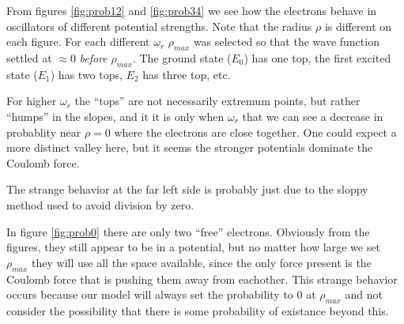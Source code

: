 

From figures \ref{fig:prob12} and \ref{fig:prob34} we see how the
electrons behave in oscillators of different potential strengths.
Note that the radius $\rho$ is different on each figure. For each
different $\omega_r$ $\rho_{max}$ was selected so that the wave
function settled at $\approx 0$ \emph{before} $\rho_{max}$. The
ground state ($E_0$) has one top, the first excited state ($E_1$)
has two tops, $E_2$ has three top, etc.

For higher $\omega_r$ the ``tops'' are not necessarily extremum
points, but rather ``humps'' in the slopes, and it it is only when
$\omega_r$ that we can see a decrease in probablity near $\rho = 0$
where the electrons are close together. One could expect a more
distinct valley here, but it seems the stronger potentials dominate
the Coulomb force.

The strange behavior at the far left side is probably just due to
the sloppy method used to avoid division by zero.


In figure \ref{fig:prob0} there are only two ``free'' electrons.
Obviously from the figures, they still appear to be in a potential,
but no matter how large we set $\rho_{max}$ they will use all the
space available, since the only force present is the Coulomb force
that is pushing them away from eachother. This strange behavior
occurs because our model will always set the probability to 0 at
$\rho_{max}$ and not consider the possibility that there is some
probability of existance beyond this.
